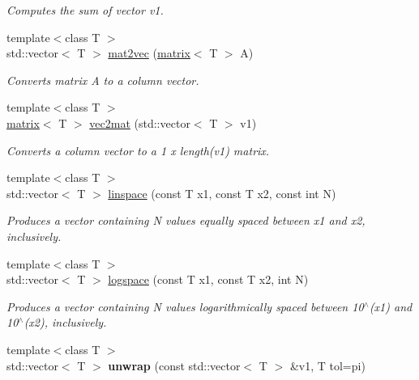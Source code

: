 \begin{DoxyCompactItemize}
\begin{DoxyCompactList}\small\item\em Computes the sum of vector v1. \end{DoxyCompactList}\item 
\hypertarget{namespacekeycpp_a8a0e8201f775945a0a61d6d645a3456e}{{\footnotesize template$<$class T $>$ }\\std\-::vector$<$ T $>$ \hyperlink{namespacekeycpp_a8a0e8201f775945a0a61d6d645a3456e}{mat2vec} (\hyperlink{classkeycpp_1_1matrix}{matrix}$<$ T $>$ A)}\label{namespacekeycpp_a8a0e8201f775945a0a61d6d645a3456e}

\begin{DoxyCompactList}\small\item\em Converts matrix A to a column vector. \end{DoxyCompactList}\item 
\hypertarget{namespacekeycpp_a4d3ef9b10b3db438529bafc5e74fa0dc}{{\footnotesize template$<$class T $>$ }\\\hyperlink{classkeycpp_1_1matrix}{matrix}$<$ T $>$ \hyperlink{namespacekeycpp_a4d3ef9b10b3db438529bafc5e74fa0dc}{vec2mat} (std\-::vector$<$ T $>$ v1)}\label{namespacekeycpp_a4d3ef9b10b3db438529bafc5e74fa0dc}

\begin{DoxyCompactList}\small\item\em Converts a column vector to a 1 x length(v1) matrix. \end{DoxyCompactList}\item 
{\footnotesize template$<$class T $>$ }\\std\-::vector$<$ T $>$ \hyperlink{namespacekeycpp_ab57eee495c93eb18ebf8c8ccf4d44e74}{linspace} (const T x1, const T x2, const int N)
\begin{DoxyCompactList}\small\item\em Produces a vector containing N values equally spaced between x1 and x2, inclusively. \end{DoxyCompactList}\item 
{\footnotesize template$<$class T $>$ }\\std\-::vector$<$ T $>$ \hyperlink{namespacekeycpp_ac92462e3b25414144d4e45fc269d2f13}{logspace} (const T x1, const T x2, int N)
\begin{DoxyCompactList}\small\item\em Produces a vector containing N values logarithmically spaced between 10$^\wedge$(x1) and 10$^\wedge$(x2), inclusively. \end{DoxyCompactList}\item 
\hypertarget{namespacekeycpp_a4e350b4b11ea4d9962b4daa13cc66e32}{{\footnotesize template$<$class T $>$ }\\std\-::vector$<$ T $>$ {\bfseries unwrap} (const std\-::vector$<$ T $>$ \&v1, T tol=pi)}\label{namespacekeycpp_a4e350b4b11ea4d9962b4daa13cc66e32}


\end{DoxyCompactItemize}
